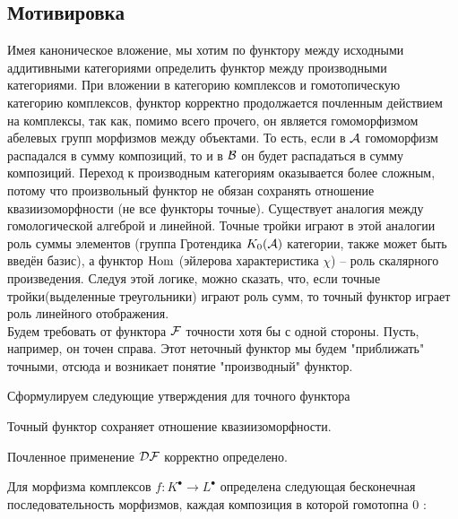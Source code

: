 \documentclass[../main.tex]{subfiles}
\begin{document}
\subsection{Мотивировка}
Имея каноническое вложение, мы хотим по функтору между исходными аддитивными категориями определить функтор между производными категориями. При вложении в категорию комплексов и гомотопическую категорию комплексов, функтор корректно продолжается почленным действием на комплексы, так как, помимо всего прочего, он является гомоморфизмом абелевых групп морфизмов между объектами. То есть, если в $\mathcal{A}$ гомоморфизм распадался в сумму композиций, то и в $\mathcal{B}$ он будет распадаться в сумму композиций. Переход к производным категориям оказывается более сложным, потому что произвольный функтор не обязан сохранять отношение квазиизоморфности (не все функторы точные). Существует аналогия между гомологической алгеброй и линейной. Точные тройки играют в этой аналогии роль суммы элементов (группа Гротендика $K_0(\mathcal{A})$ категории, также может быть введён базис), а функтор $\operatorname{Hom}$ (эйлерова характеристика $\chi$) -- роль скалярного произведения. Следуя этой логике, можно сказать, что, если точные тройки(выделенные треугольники) играют роль сумм, то точный функтор играет роль линейного отображения.\\
Будем требовать от функтора $\mathcal{F}$ точности хотя бы с одной стороны. Пусть, например, он точен справа. Этот неточный функтор мы будем "приближать" точными, отсюда и возникает понятие "производный"  функтор.
\bee
\eee
Сформулируем следующие утверждения для точного функтора 
\begin{to_claim}
 Точный функтор сохраняет отношение квазиизоморфности. 
\end{to_claim}
\begin{to_claim}
 Почленное применение $\mathcal{D F}$ корректно определено. 
\end{to_claim}
\begin{to_com}
    Для морфизма комплексов $f\colon K^\bullet\to L^\bullet$ определена следующая бесконечная последовательность морфизмов, каждая композиция в которой гомотопна 0 : 
    \bee {}\eee
\end{to_com}
\end{document}
